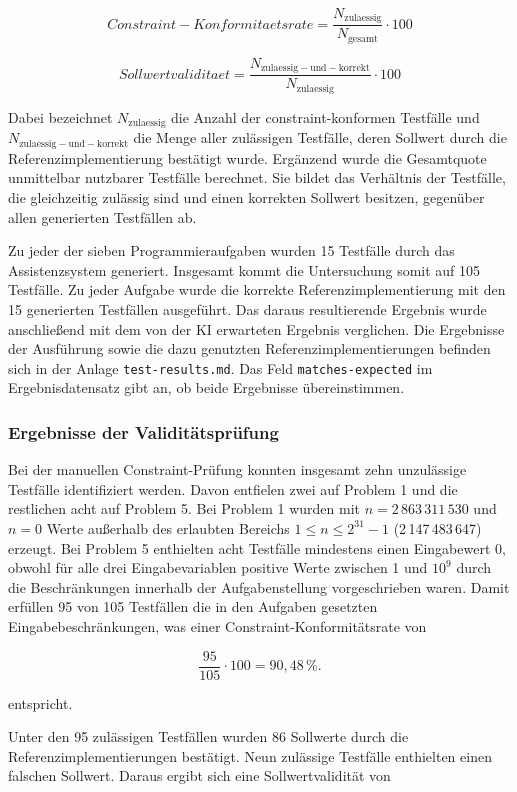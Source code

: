 \[
Constraint-Konformitaetsrate =
\frac{N_{\mathrm{zulaessig}}}{N_{\mathrm{gesamt}}} \cdot 100
\]

\[
Sollwertvaliditaet =
\frac{N_{\mathrm{zulaessig-und-korrekt}}}{N_{\mathrm{zulaessig}}} \cdot 100
\]

Dabei bezeichnet \(N_{\mathrm{zulaessig}}\) die Anzahl der
constraint-konformen Testfälle und \linebreak \(N_{\mathrm{zulaessig-und-korrekt}}\) die Menge aller zulässigen
Testfälle, deren Sollwert durch die Referenzimplementierung bestätigt wurde.
Ergänzend wurde die Gesamtquote unmittelbar nutzbarer Testfälle berechnet.
Sie bildet das Verhältnis der Testfälle, die gleichzeitig zulässig sind und einen korrekten
Sollwert besitzen, gegenüber allen generierten Testfällen ab.

Zu jeder der sieben Programmieraufgaben wurden 15 Testfälle durch das Assistenzsystem generiert. 
Insgesamt kommt die Untersuchung somit auf 105 Testfälle.
Zu jeder Aufgabe wurde die korrekte Referenzimplementierung mit den 15 generierten Testfällen ausgeführt.
Das daraus resultierende Ergebnis wurde anschließend mit dem von der \ac{KI} erwarteten Ergebnis verglichen. 
Die Ergebnisse der Ausführung sowie die dazu genutzten Referenzimplementierungen befinden sich in der Anlage \texttt{test-results.md}.
Das Feld \texttt{matches-}\allowbreak\texttt{expected} im Ergebnisdatensatz gibt an, ob beide Ergebnisse übereinstimmen.

\subsubsection{Ergebnisse der Validitätsprüfung}
Bei der manuellen Constraint-Prüfung konnten insgesamt zehn unzulässige
Testfälle identifiziert werden. Davon entfielen zwei auf Problem 1 und die restlichen 
acht auf Problem 5. Bei Problem 1 wurden mit \(n=2\,863\,311\,530\) und \(n=0\) Werte außerhalb des
erlaubten Bereichs \(1 \leq n \leq 2^{31}-1\) (2\,147\,483\,647) erzeugt. Bei Problem 5
enthielten acht Testfälle mindestens einen Eingabewert 0, obwohl für alle drei
Eingabevariablen positive Werte zwischen 1 und \(10^9\) durch die Beschränkungen 
innerhalb der Aufgabenstellung vorgeschrieben waren.
Damit erfüllen 95 von 105 Testfällen die in den Aufgaben gesetzten Eingabebeschränkungen, 
was einer Constraint-Konformitätsrate von 

\[
\frac{95}{105} \cdot 100 = 90{,}48\,\%.
\]

entspricht.

Unter den 95 zulässigen Testfällen wurden 86 Sollwerte durch die
Referenzimplementierungen bestätigt. Neun zulässige Testfälle enthielten
einen falschen Sollwert. Daraus ergibt sich eine Sollwertvalidität von 

